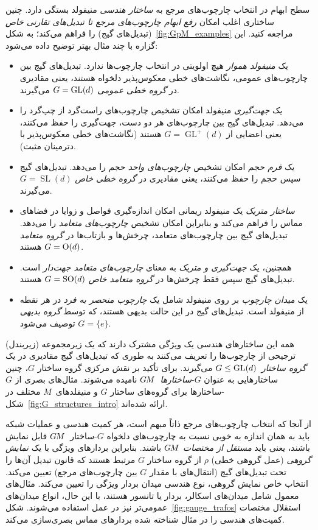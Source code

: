 سطح ابهام در انتخاب چارچوب‌های مرجع به \emph{ساختار هندسی} منیفولد بستگی دارد.
چنین ساختاری اغلب امکان \emph{رفع ابهام چارچوب‌های مرجع تا تبدیل‌های تقارنی خاص} (تبدیل‌های گیج) را فراهم می‌کند؛ به شکل~\ref{fig:GpM_examples} مراجعه کنید.
این گزاره با چند مثال بهتر توضیح داده می‌شود:
\begin{itemize}[leftmargin=1.2cm]
	\item[{\rule[2.2pt]{2pt}{2pt}}]
	یک \emph{منیفولد هموار} هیچ اولویتی در انتخاب چارچوب‌ها ندارد.
	تبدیل‌های گیج بین چارچوب‌های عمومی، نگاشت‌های خطی معکوس‌پذیر دلخواه هستند، یعنی مقادیری در \emph{گروه خطی عمومی} ${G=\operatorname{GL}(d)}$ می‌گیرند.
	\item[{\rule[2.2pt]{2pt}{2pt}}]
	یک \emph{جهت‌گیری} منیفولد امکان تشخیص چارچوب‌های راست‌گرد از چپ‌گرد را می‌دهد.
	تبدیل‌های گیج بین چارچوب‌های هر دو دست، جهت‌گیری را حفظ می‌کنند، یعنی اعضایی از ${G=\operatorname{GL}^+(d)}$ هستند (نگاشت‌های خطی معکوس‌پذیر با دترمینان مثبت).
	\item[{\rule[2.2pt]{2pt}{2pt}}]
	یک \emph{فرم حجم} امکان تشخیص \emph{چارچوب‌های واحد حجم} را می‌دهد.
	تبدیل‌های گیج سپس حجم را حفظ می‌کنند، یعنی مقادیری در \emph{گروه خطی خاص} $G=\operatorname{SL}(d)$ می‌گیرند.
	\item[{\rule[2.2pt]{2pt}{2pt}}]
	\emph{ساختار متریک} یک منیفولد ریمانی امکان اندازه‌گیری فواصل و زوایا در فضاهای مماس را فراهم می‌کند و بنابراین امکان تشخیص \emph{چارچوب‌های متعامد} را می‌دهد.
	تبدیل‌های گیج بین چارچوب‌های متعامد، چرخش‌ها و بازتاب‌ها در \emph{گروه متعامد} $G=\operatorname{O}(d)$ هستند.
	\item[{\rule[2.2pt]{2pt}{2pt}}]
	همچنین، یک \emph{جهت‌گیری و متریک} به معنای \emph{چارچوب‌های متعامد جهت‌دار} است.
	تبدیل‌های گیج سپس فقط چرخش‌ها در \emph{گروه متعامد خاص} $G=\operatorname{SO}(d)$ هستند.
	\item[{\rule[2.2pt]{2pt}{2pt}}]
	یک \emph{میدان چارچوب} بر روی منیفولد شامل یک \emph{چارچوب منحصر به فرد} در هر نقطه از منیفولد است.
	تبدیل‌های گیج در این حالت بدیهی هستند، که توسط \emph{گروه بدیهی} $G=\{e\}$ توصیف می‌شود.
\end{itemize}
همه این ساختارهای هندسی یک ویژگی مشترک دارند که یک زیرمجموعه (زیربندل) ترجیحی از چارچوب‌ها را تعریف می‌کنند به طوری که تبدیل‌های گیج مقادیری در یک \emph{گروه ساختار}~$G\leq\operatorname{GL}(d)$ می‌گیرند.
برای تأکید بر نقش مرکزی گروه ساختار $G$، چنین ساختارهایی به عنوان $G$-\emph{ساختارها}~$G\mkern-1.4muM$ نامیده می‌شوند.
مثال‌های بصری از $G$-ساختارها برای گروه‌های ساختار $G$ و منیفلدهای~$M$ مختلف در شکل~\ref{fig:G_structures_intro} ارائه شده‌اند.


از آنجا که انتخاب چارچوب‌های مرجع ذاتاً مبهم است، هر کمیت هندسی و عملیات شبکه باید به همان اندازه به خوبی نسبت به چارچوب‌های دلخواه $G$-ساختار~$G\mkern-1.4muM$ قابل نمایش باشند، یعنی باید \emph{مستقل از مختصات} $G\mkern-1.4muM$ باشند.
بنابراین بردارهای ویژگی با یک \emph{نمایش گروهی} (عمل گروهی خطی) $\rho$ از گروه ساختار $G$ مرتبط هستند که قانون تبدیل آن‌ها را تحت تبدیل‌های گیج (انتقال‌های با مقدار $G$ بین چارچوب‌های مرجع) تعیین می‌کند.
انتخاب خاص نمایش گروهی، نوع هندسی میدان بردار ویژگی را تعیین می‌کند.
مثال‌های معمول شامل میدان‌های اسکالر، بردار یا تانسور هستند، با این حال، انواع میدان‌های عمومی‌تر نیز در عمل استفاده می‌شوند.
شکل~\ref{fig:gauge_trafos} استقلال مختصات کمیت‌های هندسی را در مثال شناخته شده بردارهای مماس بصری‌سازی می‌کند.



